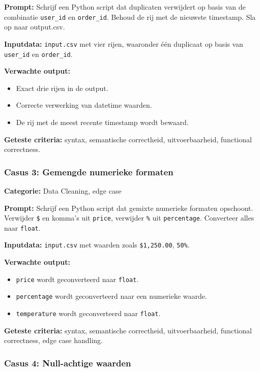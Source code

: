 \textbf{Prompt:} Schrijf een Python script dat duplicaten verwijdert op basis van de combinatie \texttt{user\_id} en \texttt{order\_id}. Behoud de rij met de nieuwste timestamp. Sla op naar output.csv.

\textbf{Inputdata:} \texttt{input.csv} met vier rijen, waaronder één duplicaat op basis van \texttt{user\_id} en \texttt{order\_id}.

\textbf{Verwachte output:}
\begin{itemize}
    \item Exact drie rijen in de output.
    \item Correcte verwerking van datetime waarden.
    \item De rij met de meest recente timestamp wordt bewaard.
\end{itemize}

\textbf{Geteste criteria:} syntax, semantische correctheid, uitvoerbaarheid, functional correctness.

\subsubsection*{Casus 3: Gemengde numerieke formaten}

\textbf{Categorie:} Data Cleaning, edge case

\textbf{Prompt:} Schrijf een Python script dat gemixte numerieke formaten opschoont. Verwijder \texttt{\$} en komma's uit \texttt{price}, verwijder \texttt{\%} uit \texttt{percentage}. Converteer alles naar \texttt{float}.

\textbf{Inputdata:} \texttt{input.csv} met waarden zoals \texttt{\$1,250.00}, \texttt{50\%}.

\textbf{Verwachte output:}
\begin{itemize}
    \item \texttt{price} wordt geconverteerd naar \texttt{float}.
    \item \texttt{percentage} wordt geconverteerd naar een numerieke waarde.
    \item \texttt{temperature} wordt geconverteerd naar \texttt{float}.
\end{itemize}

\textbf{Geteste criteria:} syntax, semantische correctheid, uitvoerbaarheid, functional correctness, edge case handling.

\subsubsection*{Casus 4: Null-achtige waarden}

